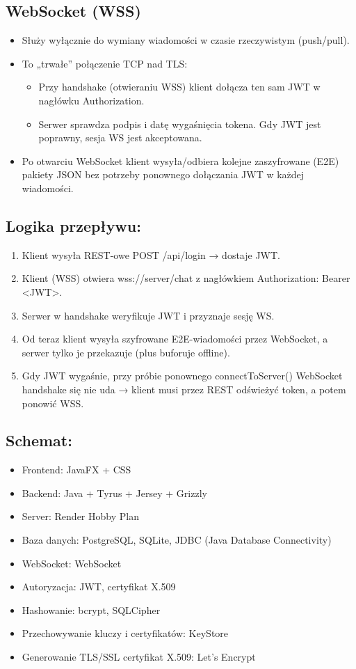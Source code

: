 \documentclass[a4paper,12pt]{article}
\begin{document}
\subsection*{WebSocket (WSS)}
\begin{itemize}
    \item Służy wyłącznie do wymiany wiadomości w czasie rzeczywistym (push/pull).
    \item To „trwałe” połączenie TCP nad TLS:
    \begin{itemize}
        \item Przy handshake (otwieraniu WSS) klient dołącza ten sam JWT w nagłówku Authorization.
        \item Serwer sprawdza podpis i datę wygaśnięcia tokena. Gdy JWT jest poprawny, sesja WS jest akceptowana.
    \end{itemize}
    \item Po otwarciu WebSocket klient wysyła/odbiera kolejne zaszyfrowane (E2E) pakiety JSON bez potrzeby ponownego dołączania JWT w każdej wiadomości.
\end{itemize}

\subsection*{Logika przepływu:}
\begin{enumerate}
    \item Klient wysyła REST-owe POST /api/login → dostaje JWT.
    \item Klient (WSS) otwiera wss://server/chat z nagłówkiem Authorization: Bearer <JWT>.
    \item Serwer w handshake weryfikuje JWT i przyznaje sesję WS.
    \item Od teraz klient wysyła szyfrowane E2E-wiadomości przez WebSocket, a serwer tylko je przekazuje (plus buforuje offline).
    \item Gdy JWT wygaśnie, przy próbie ponownego connectToServer() WebSocket handshake się nie uda → klient musi przez REST odświeżyć token, a potem ponowić WSS.
\end{enumerate}

\subsection*{Schemat:}
\begin{itemize}
    \item Frontend: JavaFX + CSS
    \item Backend: Java + Tyrus + Jersey + Grizzly
    \item Server: Render Hobby Plan
    \item Baza danych: PostgreSQL, SQLite, JDBC (Java Database Connectivity)
    \item WebSocket: WebSocket
    \item Autoryzacja: JWT, certyfikat X.509
    \item Hashowanie: bcrypt, SQLCipher
    \item Przechowywanie kluczy i certyfikatów: KeyStore
    \item Generowanie TLS/SSL certyfikat X.509: Let’s Encrypt
\end{itemize}
\end{document}
